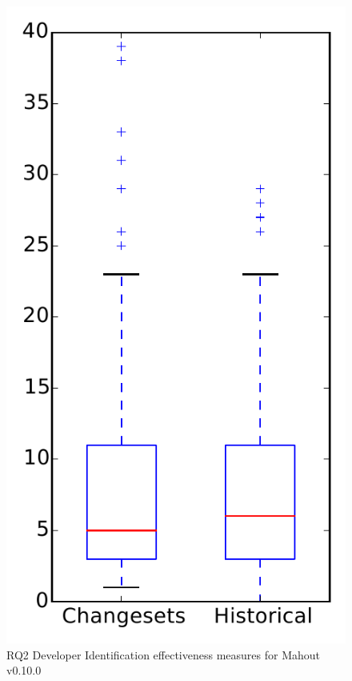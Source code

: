 
\begin{figure}
\centering
\includegraphics[height=0.4\textheight]{figures/dit/rq2_mahout}
\caption{RQ2 Developer Identification effectiveness measures for Mahout v0.10.0}
\label{fig:dit:rq2:mahout}
\end{figure}
